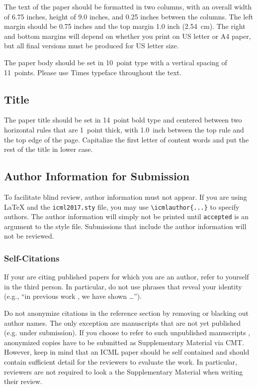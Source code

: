 \documentclass{article}
\begin{document}
The text of the paper should be formatted in two columns, with an
overall width of 6.75 inches, height of 9.0 inches, and 0.25 inches
between the columns. The left margin should be 0.75 inches and the top
margin 1.0 inch (2.54~cm). The right and bottom margins will depend on
whether you print on US letter or A4 paper, but all final versions
must be produced for US letter size.

The paper body should be set in 10~point type with a vertical spacing
of 11~points. Please use Times typeface throughout the text.

\subsection{Title}

The paper title should be set in 14~point bold type and centered
between two horizontal rules that are 1~point thick, with 1.0~inch
between the top rule and the top edge of the page. Capitalize the
first letter of content words and put the rest of the title in lower
case.

\subsection{Author Information for Submission}
\label{author info}

To facilitate blind review, author information must not appear.  If
you are using \LaTeX\/ and the \texttt{icml2017.sty} file, you may use
\verb+\icmlauthor{...}+ to specify authors.  The author information
will simply not be printed until {\tt accepted} is an argument to the
style file. Submissions that include the author information will not
be reviewed.

\subsubsection{Self-Citations}

If your are citing published papers for which you are an author, refer
to yourself in the third person. In particular, do not use phrases
that reveal your identity (e.g., ``in previous work \cite{langley00}, we 
have shown \ldots'').

Do not anonymize citations in the reference section by removing or
blacking out author names. The only exception are manuscripts that are
not yet published (e.g. under submission). If you choose to refer to
such unpublished manuscripts \cite{anonymous}, anonymized copies have 
to be submitted
as Supplementary Material via CMT. However, keep in mind that an ICML
paper should be self contained and should contain sufficient detail
for the reviewers to evaluate the work. In particular, reviewers are
not required to look a the Supplementary Material when writing their
review.
\end{document}
